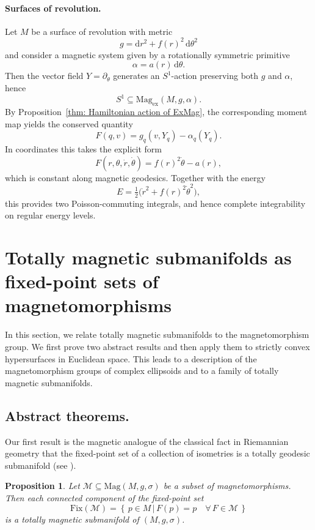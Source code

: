 \documentclass[11pt,reqno]{amsart}
\theoremstyle{plain}
\newtheorem{prop}[thm]{Proposition}
\theoremstyle{definition}
\numberwithin{equation}{section}
\def\d{\delta}
\def\d{\delta}
\def\d{{\mathrm{d}}}
\newcommand{\set}[2]{\left\{ \, #1  \, | \,  #2 \, \right\}}
\begin{document}
\paragraph{\textbf{Surfaces of revolution.}}
Let $M$ be a surface of revolution with metric
\[
g=\d r^2+f(r)^2\,\d\theta^2
\]
and consider a magnetic system given by a rotationally symmetric primitive
\[
\alpha=a(r)\,\d\theta.
\]
Then the vector field $Y=\partial_\theta$ generates an $S^1$-action preserving both $g$ and $\alpha$, hence
\[
S^1\subseteq \mathrm{Mag}_{\mathrm{ex}}(M,g,\alpha).
\]
By Proposition~\ref{thm: Hamiltonian action of ExMag}, the corresponding moment map yields the conserved quantity
\[
F(q,v)=g_q(v,Y_q)-\alpha_q(Y_q).
\]
In coordinates this takes the explicit form
\[
F(r,\theta,\dot r,\dot\theta)=f(r)^2\dot\theta-a(r),
\]
which is constant along magnetic geodesics. Together with the energy
\[
E=\tfrac12\big(\dot r^2+f(r)^2\dot\theta^2\big),
\]
this provides two Poisson-commuting integrals, and hence complete integrability on regular energy levels.

\section{Totally magnetic submanifolds as fixed-point sets of magnetomorphisms}
\label{subsection: magnetic geometry - abstract results}

In this section, we relate totally magnetic submanifolds to the magnetomorphism group. We first prove two abstract results and then apply them to strictly convex hypersurfaces in Euclidean space. This leads to a description of the magnetomorphism groups of complex ellipsoids and to a family of totally magnetic submanifolds.

\subsection{Abstract theorems.}

Our first result is the magnetic analogue of the classical fact in Riemannian geometry that the fixed-point set of a collection of isometries is a totally geodesic submanifold (see \cite[Prop.~5.6.5]{Pet}).

\begin{prop}
\label{prop: totally magnetic submfds - fixed point set}
Let $\mathcal{M} \subseteq \mathrm{Mag}(M,g,\sigma)$ be a subset of magnetomorphisms. Then each connected component of the fixed-point set
\[
\mathrm{Fix}(\mathcal{M}) = \set{p \in M}{F(p) = p \quad \forall \, F \in \mathcal{M}}
\]
is a totally magnetic submanifold of $(M,g,\sigma)$.
\end{prop}
\end{document}
